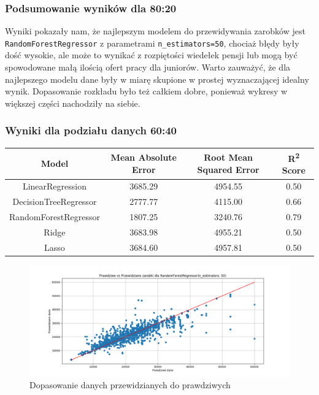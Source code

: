\documentclass[a4paper]{article}
\begin{document}
\subsubsection{Podsumowanie wyników dla 80:20}

\quad Wyniki pokazały nam, że najlepszym modelem do przewidywania zarobków jest \texttt{RandomForestRegressor} z parametrami \texttt{n\_estimators=50},
chociaż błędy były dość wysokie, ale może to wynikać z rozpiętości wiedełek pensji lub mogą być spowodowane małą ilością ofert pracy dla juniorów. Warto zauważyć, że
dla najlepszego modelu dane były w miarę skupione w prostej wyznaczającej idealny wynik. Dopasowanie rozkładu było też całkiem dobre, ponieważ
wykresy w większej części nachodziły na siebie.


\subsubsection{Wyniki dla podziału danych 60:40}

\begin{table}[H]
    \centering
    \begin{tabular}{|c|c|c|c|}
        \hline
        \textbf{Model}        & \textbf{Mean Absolute Error} & \textbf{Root Mean Squared Error} & \textbf{R\textsuperscript{2} Score} \\ \hline
        LinearRegression      & 3685.29                      & 4954.55                          & 0.50                                \\ \hline
        DecisionTreeRegressor & 2777.77                      & 4115.00                          & 0.66                                \\ \hline
        RandomForestRegressor & 1807.25                      & 3240.76                          & 0.79                                \\ \hline
        Ridge                 & 3683.98                      & 4955.21                          & 0.50                                \\ \hline
        Lasso                 & 3684.60                      & 4957.81                          & 0.50                                \\ \hline
    \end{tabular}
\end{table}

\begin{figure}[H]
    \centering
    \includegraphics[width=\textwidth]{../analysis/plots/wyniki/0.6&0.4/RandomForestRegressor/scatter.png}
    \caption{Dopasowanie danych przewidzianych do prawdziwych}
\end{figure}
\end{document}
